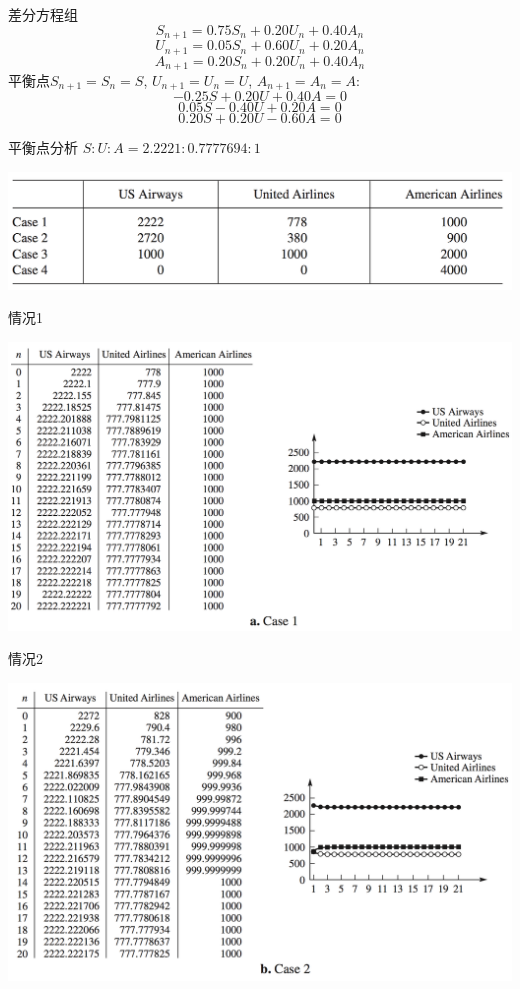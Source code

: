 \documentclass[UTF8]{ctexbeamer}
\begin{document}
\begin{frame}{差分方程组}
\[
S_{n+1}=0.75S_n+0.20U_n+0.40A_n
\]
\[
U_{n+1}=0.05S_n+0.60U_n+0.20A_n
\]
\[
A_{n+1}=0.20S_n+0.20U_n+0.40A_n
\]
平衡点$S_{n+1}=S_n=S$, $U_{n+1}=U_n=U$, $A_{n+1}=A_n=A$:
\[
-0.25S+0.20U+0.40A=0
\]
\[
0.05S-0.40U+0.20A=0
\]
\[
0.20S+0.20U-0.60A=0
\]
\end{frame}

\begin{frame}{平衡点分析}
$S:U:A = 2.2221:0.7777694:1$

\begin{center}
  \includegraphics[width=.8\textwidth{}]{party-case.png}
\end{center}  
  
\end{frame}

\begin{frame}{情况1}
  \begin{center}
    \includegraphics[width=.9\textwidth{}]{party-1.png}
  \end{center}  
\end{frame}

\begin{frame}{情况2}
  \begin{center}
    \includegraphics[width=.9\textwidth{}]{party-2.png}
  \end{center}  
\end{frame}
\end{document}

